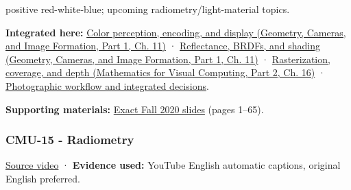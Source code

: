 positive red-white-blue; upcoming radiometry/light-material topics.

\textbf{Integrated here:} \href{../03-Geometry-Cameras-and-Image-Formation-P01/main.pdf\#03-visual-computing-i-ch004-color-perception-encoding-and-display}{Color perception, encoding, and display (Geometry, Cameras, and Image Formation, Part 1, Ch. 11)} · \href{../03-Geometry-Cameras-and-Image-Formation-P01/main.pdf\#03-visual-computing-i-ch004-reflectance-brdfs-and-shading}{Reflectance, BRDFs, and shading (Geometry, Cameras, and Image Formation, Part 1, Ch. 11)} · \href{../02-Mathematics-for-Visual-Computing-P02/main.pdf\#03-visual-computing-i-ch012-rasterization-coverage-and-depth}{Rasterization, coverage, and depth (Mathematics for Visual Computing, Part 2, Ch. 16)} · \hyperref[04-visual-computing-ii-ch034-photographic-workflow-and-integrated-decisions]{Photographic workflow and integrated decisions}.

\textbf{Supporting materials:} \href{https://15462.courses.cs.cmu.edu/fall2020content/lectures/14_color/14_color_slides.pdf}{Exact Fall 2020 slides} (pages 1--65).

\subsubsection{CMU-15 - Radiometry}\label{04-visual-computing-ii-ch036-cmu-15---radiometry}

\hypertarget{04-visual-computing-ii-ch036-cmu-15---radiometry}{}

\href{https://www.youtube.com/watch?v=5lGYm8L_rfo}{Source video} · \textbf{Evidence used:} YouTube English automatic captions, original English preferred.

